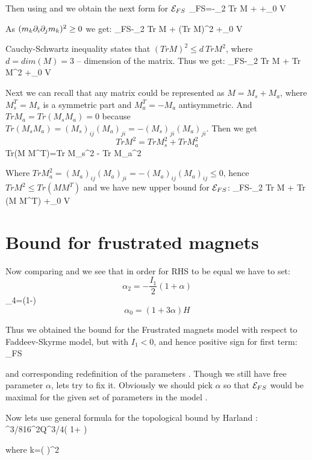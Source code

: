 \documentclass[12pt,a4paper]{article}
\begin{document}
Then using  and  we obtain the next form for $\mathcal{E}_{FS}$
\be
\CE_{FS}=-\alpha_2 Tr M + \left[ (Tr M)^2 - (m_k \pa_i \pa_j m_k)^2 \right]+\alpha_0 V
\ee

As $(m_k \partial_i \partial_j m_k)^2\geq0$ we get:
\be
\CE_{FS}\leq -\alpha_2 Tr M + (Tr M)^2 +\alpha_0 V
\ee

Cauchy-Schwartz inequality states that $(Tr M)^2\leq d\  Tr M^2$, where $d=dim(M)=3$ -- dimension of the matrix. Thus we get:
\be
\CE_{FS}\leq -\alpha_2 Tr M + Tr M^2 +\alpha_0 V
\ee

Next we can recall that any matrix could be represented as $M=M_s+M_a$, where $M_s^T=M_s$ is a symmetric part and $M_a^T=-M_a$ antisymmetric. And $Tr M_a=Tr(M_s M_a)=0$ because $Tr(M_s M_a)=(M_s)_{ij}(M_a)_{ji}=-(M_s)_{ji}(M_a)_{ji}$. Then we get
$$
TrM^2=Tr M_s^2 + Tr M_a^2
$$
\be
Tr(M M^T)=Tr M_s^2 - Tr M_a^2
\ee

Where $Tr M_a^2= (M_a)_{ij}(M_a)_{ji}=-(M_a)_{ij}(M_a)_{ij}\leq 0$, hence $Tr M^2 \leq Tr(M M^T)$ and we have new upper bound for $\mathcal{E}_{FS}$:
\be\label{FS}
\CE_{FS}\leq -\alpha_2 Tr M + Tr (M M^T) +\alpha_0 V
\ee

\section{Bound for frustrated magnets}
Now comparing  and  we see that in order for RHS to be equal we have to set:
$$
\alpha_2=-\frac{I_1}{2}(1+\alpha)
$$
\be\label{param}
\alpha_4=(1-\alpha)
\ee
$$
\alpha_0=(1+3\alpha)H
$$

Thus we obtained the bound for the Frustrated magnets model with respect to Faddeev-Skyrme model, but with $I_1<0$, and hence positive sign for first term:
\be\label{geqFS}
\CE\geq\CE_{FS}
\ee

and corresponding redefinition of the parameters . Though we still have free parameter $\alpha$, lets try to fix it. Obviously we should pick $\alpha$ so that $\mathcal{E}_{FS}$ would be maximal for the given set of parameters in the model .

Now lets use general formula for the topological bound by Harland \cite{harland}:
\be
\CE{}^{3/8}16\pi^2Q^{3/4}\left( 1+ \right)
\ee

where 
\be
k=\left(  \right)^2 
\ee
\end{document}
